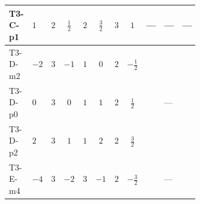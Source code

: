 \documentclass[8pt]{article}
\begin{document}
\begin{landscape}
\begin{longtable}{@{}llcccccc >{\raggedright\arraybackslash}p{0.21\linewidth} >{\raggedright\arraybackslash}p{0.21\linewidth} >{\raggedright\arraybackslash}p{0.21\linewidth}@{}}
\midrule
T3-C-p1 & $1$ & $2$ & $\frac{1}{2}$ & $2$ & $\frac{3}{2}$ & $3$ & $1$ & --- & --- & --- \\
\midrule
T3-D-m2 & $-2$ & $3$ & $-1$ & $1$ & $0$ & $2$ & $-\frac{1}{2}$ & \scriptsize\adjustbox{max width=\linewidth}{$\begin{gathered} +\frac{3 {g_2}^4}{4}\end{gathered}$} & \scriptsize\adjustbox{max width=\linewidth}{$\begin{gathered} +{g_1}^2 \left(9 {g_2}^2-\frac{3 {\lambda_{S_1}^{(1)}}}{2}-12 {\lambda_{S_1}^{(A)}}\right)\end{gathered}$} & \scriptsize\adjustbox{max width=\linewidth}{$\begin{gathered} +{g_2}^2 (-3 {\lambda_{S_1}^{(1)}}-24 {\lambda_{S_1}^{(A)}})\end{gathered}$} \\
\midrule
T3-D-p0 & $0$ & $3$ & $0$ & $1$ & $1$ & $2$ & $\frac{1}{2}$ & \scriptsize\adjustbox{max width=\linewidth}{$\begin{gathered} +\frac{3 {g_2}^4}{4}\end{gathered}$} & --- & \scriptsize\adjustbox{max width=\linewidth}{$\begin{gathered} +{g_2}^2 (-3 {\lambda_{S_1}^{(1)}}-24 {\lambda_{S_1}^{(A)}})\end{gathered}$} \\
\midrule
T3-D-p2 & $2$ & $3$ & $1$ & $1$ & $2$ & $2$ & $\frac{3}{2}$ & \scriptsize\adjustbox{max width=\linewidth}{$\begin{gathered} +\frac{3 {g_2}^4}{4}\end{gathered}$} & \scriptsize\adjustbox{max width=\linewidth}{$\begin{gathered} +{g_1}^2 \left(9 {g_2}^2-\frac{3 {\lambda_{S_1}^{(1)}}}{2}-12 {\lambda_{S_1}^{(A)}}\right)\end{gathered}$} & \scriptsize\adjustbox{max width=\linewidth}{$\begin{gathered} +{g_2}^2 (-3 {\lambda_{S_1}^{(1)}}-24 {\lambda_{S_1}^{(A)}})\end{gathered}$} \\
\midrule
T3-E-m4 & $-4$ & $3$ & $-2$ & $3$ & $-1$ & $2$ & $-\frac{3}{2}$ & \scriptsize\adjustbox{max width=\linewidth}{$\begin{gathered} +\frac{3 {g_2}^4}{4}\end{gathered}$} & --- & \scriptsize\adjustbox{max width=\linewidth}{$\begin{gathered} +{g_2}^2 (-3 {\lambda_{S_1}^{(1)}}-24 {\lambda_{S_1}^{(A)}})\end{gathered}$} \\

\end{longtable}
\end{landscape}
\end{document}
